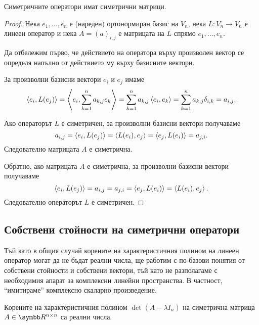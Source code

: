 \documentclass[
  headings=standardclasses,
  bibliography=totocnumbered,
]{scrartcl}
\begin{document}
\begin{theorem}
  Симетричните оператори имат симетрични матрици.
\end{theorem}
\begin{proof}
  Нека \( e_1, \ldots, e_n \) е (нареден) ортонормиран базис на \( V_n \), нека \( L: V_n \to V_n \) е линеен оператор и нека \( A = {(a)}_{i,j} \) е матрицата на \( L \) спрямо \( e_1, \ldots, e_n \).

  Да отбележим първо, че действието на оператора върху произволен вектор се определя напълно от действието му върху базисните вектори.

  За произволни базисни вектори \( e_i \) и \( e_j \) имаме
  \begin{equation*}
    \left\langle e_i, L(e_j) \right\rangle
    =
    \left\langle e_i, \sum_{k=1}^n a_{k,j} e_k \right\rangle
    =
    \sum_{k=1}^n a_{k,j} \left\langle e_i, e_k \right\rangle
    =
    \sum_{k=1}^n a_{k,j} \delta_{i,k}
    =
    a_{i,j}.
  \end{equation*}

  \Sufficiency Ако операторът \( L \) е симетричен, за произволни базисни вектори получаваме
  \begin{equation*}
    a_{i,j}
    =
    \left\langle e_i, L(e_j) \right\rangle
    =
    \left\langle L(e_i), e_j \right\rangle
    =
    \left\langle e_j, L(e_i) \right\rangle
    =
    a_{j,i}.
  \end{equation*}
  Следователно матрицата \( A \) е симетрична.

  \Necessity Обратно, ако матрицата \( A \) е симетрична, за произволни базисни вектори получаваме
  \begin{equation*}
    \left\langle e_i, L(e_j) \right\rangle
    =
    a_{i,j}
    =
    a_{j,i}
    =
    \left\langle e_j, L(e_i) \right\rangle
    =
    \left\langle L(e_i), e_j \right\rangle.
  \end{equation*}
  Следователно операторът \( L \) е симетричен.
\end{proof}

\subsection{Собствени стойности на симетрични оператори}

Тъй като в общия случай корените на характеристичния полином на линеен оператор могат да не бъдат реални числа, ще работим с по-базови понятия от собствени стойности и собствени вектори, тъй като не разполагаме с необходимия апарат за комплексни линейни пространства. В частност, \enquote{имитираме} комплексно скаларно произведение.

\begin{theorem}
  Корените на характеристичния полином \( \det(A - \lambda I_n) \) на симетрична матрица \( A \in \R^{n \times n} \) са реални числа.
\end{theorem}
\end{document}
